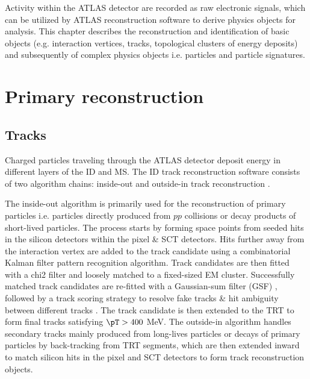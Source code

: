 \documentclass[../thesis.tex]{subfiles}
\begin{document}
\vspace{-1\baselineskip}

Activity within the \acs{ATLAS} detector are recorded as raw electronic signals, which can be utilized by \acs{ATLAS} reconstruction software to derive physics objects for analysis. This chapter describes the reconstruction and identification of basic objects (e.g. interaction vertices, tracks, topological clusters of energy deposits) and subsequently of complex physics objects i.e. particles and particle signatures.

\section{Primary reconstruction}
\label{sec:primaryreco}

\subsection{Tracks}

Charged particles traveling through the ATLAS detector deposit energy in different layers of the \acs{ID} and \acs{MS}. The \acs{ID} track reconstruction software consists of two algorithm chains: inside-out and outside-in track reconstruction \citep{reco:track,reco:io,reco:oi}.

The inside-out algorithm is primarily used for the reconstruction of primary particles i.e. particles directly produced from $pp$ collisions or decay products of short-lived particles. The process starts by forming space points from seeded hits in the silicon detectors within the pixel \& \acs{SCT} detectors. Hits further away from the interaction vertex are added to the track candidate using a combinatorial Kalman filter \citep{reco:kalman} pattern recognition algorithm. Track candidates are then fitted with a \acs{chi2} filter \citep{reco:track_chi2} and loosely matched to a fixed-sized \acs{EM} cluster. Successfully matched track candidates are re-fitted with a Gaussian-sum filter (GSF) \citep{reco:track_gsf}, followed by a track scoring strategy to resolve fake tracks \& hit ambiguity between different tracks \citep{reco:track_ambiguity}. The track candidate is then extended to the \acs{TRT} to form final tracks satisfying $\pT > 400$ MeV. The outside-in algorithm handles secondary tracks mainly produced from long-lives particles or decays of primary particles by back-tracking from \acs{TRT} segments, which are then extended inward to match silicon hits in the pixel and \acs{SCT} detectors to form track reconstruction objects.
\end{document}
